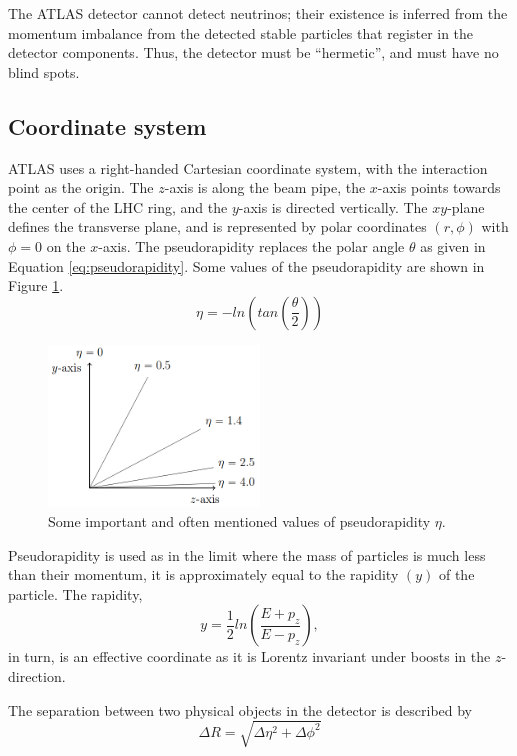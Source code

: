 \documentclass[11pt,a4paper,openright,twoside]{report}
\begin{document}
The ATLAS detector cannot detect neutrinos; their existence is inferred from the momentum imbalance from the detected stable particles that register in the detector components. Thus, the detector must be ``hermetic'', and must have no blind spots.

\subsection{Coordinate system}
ATLAS uses a right-handed Cartesian coordinate system, with the interaction point as the origin. The $z$-axis is along the beam pipe, the $x$-axis points towards the center of the LHC ring, and the $y$-axis is directed vertically. The $xy$-plane defines the transverse plane, and is represented by polar coordinates $(r,\phi)$ with $\phi=0$ on the $x$-axis. The pseudorapidity replaces the polar angle $\theta$ as given in Equation \ref{eq:pseudorapidity}. Some values of the pseudorapidity are shown in Figure \ref{fig:eta}.
\begin{equation}
\eta = -ln\left(tan\left(\frac{\theta}{2}\right)\right)
\label{eq:pseudorapidity}
\end{equation}

\begin{figure}[h]
\centering
\includegraphics[width=0.5\textwidth]{prapidity.png}
\caption{Some important and often mentioned values of pseudorapidity $\eta$.}
\label{fig:eta}
\end{figure}

Pseudorapidity is used as in the limit where the mass of particles is much less than their momentum, it is approximately equal to the rapidity $(y)$ of the particle. The rapidity,
\begin{equation}
y = \frac{1}{2} ln\left(\frac{E+p_z}{E-p_z}\right),
\end{equation}
in turn, is an effective coordinate as it is Lorentz invariant under boosts in the $z$-direction.

The separation between two physical objects in the detector is described by 
\begin{equation}
\Delta R = \sqrt{\Delta\eta^2 + \Delta\phi^2}
\end{equation}
\end{document}
